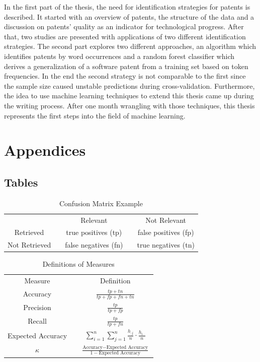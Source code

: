 \documentclass[12pt, a4paper, abstract, parskip]{scrartcl}
\newcommand{\ra}[1]{\renewcommand{\arraystretch}{#1}}
\theoremstyle{definition}
\begin{document}
In the first part of the thesis, the need for identification strategies for
patents is described. It started with an overview of patents, the structure of
the data and a discussion on patents' quality as an indicator for technological
progress. After that, two studies are presented with applications of two
different identification strategies. The second part explores two different
approaches, an algorithm which identifies patents by word occurrences and a
random forest classifier which derives a generalization of a software patent
from a training set based on token frequencies. In the end the second strategy
is not comparable to the first since the sample size  caused unstable
predictions during cross-validation. Furthermore, the idea to use machine
learning techniques to extend this thesis came up during the writing process.
After one month wrangling with those techniques, this thesis represents the
first steps into the field of machine learning.


\newpage

\appendix
\section*{Appendices}
\renewcommand{\thesubsection}{\Alph{subsection}}

\subsection{Tables}

\begin{table}[!hp]\caption{Confusion Matrix Example}\label{tab:confusion_example}\centering\ra{1.3}
\begin{tabular}{@{}cp{0.5cm}cp{0.5cm}c@{}} \toprule
 & & Relevant & & Not Relevant\\ \cline{1-1} \cline{3-3} \cline{5-5}
Retrieved & & true positives (tp) & & false positives (fp)\\
Not Retrieved & & false negatives (fn) & & true negatives (tn)\\
\bottomrule
\end{tabular}
\end{table}

\begin{table}[!hp]\caption{Definitions of Measures}\label{tab:definition_measure}\centering\ra{2}
\begin{tabular}{@{}cp{2cm}c@{}} \toprule
Measure & & Definition\\ \cline{1-1} \cline{3-3}
Accuracy & & $\frac{tp + tn}{tp + fp + fn + tn}$\\
Precision & & $\frac{tp}{tp + fp}$\\
Recall & & $\frac{tp}{tp + fn}$\\
Expected Accuracy & & $\sum^n_{i=1}\sum^n_{j=1}\frac{h_{\cdot j}}{n}\cdot\frac{h_{i \cdot}}{n}$\\
$\kappa$ & & $\frac{\text{Accuracy} - \text{Expected Accuracy}}{1 - \text{Expected Accuracy}}$\\
\bottomrule
\end{tabular}
\end{table}
\end{document}
